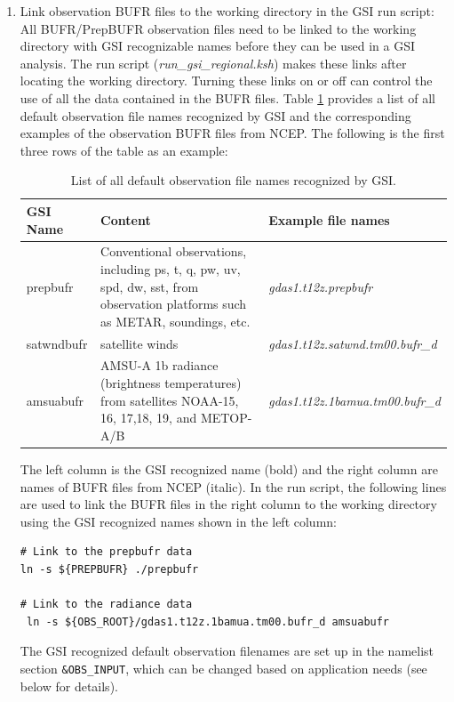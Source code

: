 \begin{enumerate}[leftmargin=*]
\item Link observation BUFR files to the working directory in the GSI run script:\\

All BUFR/PrepBUFR observation files need to be linked to the working directory with GSI recognizable names before they can be used in a GSI analysis. The run script (\textit{run\_gsi\_regional.ksh}) makes these links after locating the working directory. Turning these links on or off can control the use of all the data contained in the BUFR files. Table \ref{tab41} provides a list of all default observation file names recognized by GSI and the corresponding examples of the observation BUFR files from NCEP. The following is the first three rows of the table as an example:
\begin{table}[htbp]
\centering
\caption{List of all default observation file names recognized by GSI.}
\begin{tabular}{|p{2cm}|p{9cm}|p{5cm}|}
\hline
\hline
GSI Name & Content & Example file names \\
\hline
prepbufr & Conventional observations, including ps, t, q, pw, uv, spd, dw, sst, from observation platforms such as METAR, soundings, etc. & \textit{gdas1.t12z.prepbufr} \\
\hline
satwndbufr & satellite winds &	\textit{gdas1.t12z.satwnd.tm00.bufr\_d} \\
\hline
amsuabufr & AMSU-A 1b radiance (brightness temperatures) from satellites NOAA-15, 16, 17,18, 19, and METOP-A/B &	\textit{gdas1.t12z.1bamua.tm00.bufr\_d} \\
\hline
\end{tabular}
\label{tab41}
\end{table} 

The left column is the GSI recognized name (bold) and the right column are names of BUFR files from NCEP (italic). In the run script, the following lines are used to link the BUFR files in the right column to the working directory using the GSI recognized names shown in the left column:

\begin{scriptsize}
\begin{verbatim}
# Link to the prepbufr data
ln -s ${PREPBUFR} ./prepbufr

# Link to the radiance data
 ln -s ${OBS_ROOT}/gdas1.t12z.1bamua.tm00.bufr_d amsuabufr
\end{verbatim}
\end{scriptsize}
The GSI recognized default observation filenames are set up in the namelist section \verb|&OBS_INPUT|, which can be changed based on application needs (see below for details). \\


\end{enumerate}
